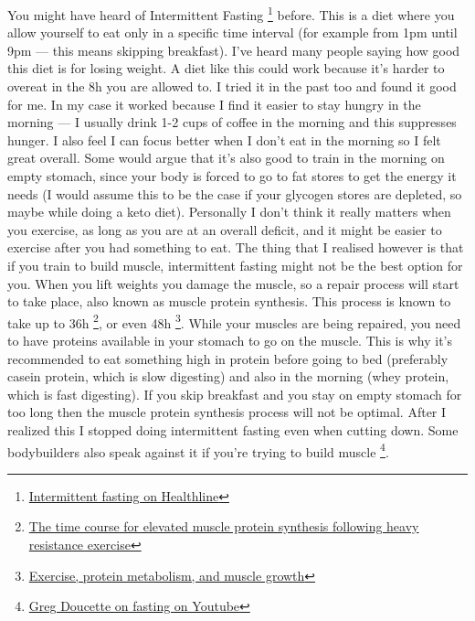 \documentclass[openany, 12pt]{book}
\begin{document}
        You might have heard of Intermittent Fasting
        \footnote{\href{https://www.healthline.com/nutrition/intermittent-fasting-guide}{Intermittent fasting on Healthline}}
        before. This is a diet where you allow yourself to eat only in a specific time interval (for example from 1pm until 9pm --- this means skipping breakfast).
        I've heard many people saying how good this diet is for losing weight. A diet like this could work because it's harder to overeat in the 8h you are allowed to.
        I tried it in the past too and found it good for me. In my case it worked because I find it easier to stay hungry in the morning --- I usually drink 1-2 cups of coffee
        in the morning and this suppresses hunger. I also feel I can focus better when I don't eat in the morning so I felt great overall. Some would argue that it's also good
        to train in the morning on empty stomach, since your body is forced to go to fat stores to get the energy it needs (I would assume this to be the case if your glycogen
        stores are depleted, so maybe while doing a keto diet). Personally I don't think it really matters when you exercise, as long as you are at an overall deficit, and it
        might be easier to exercise after you had something to eat. The thing that I realised however is that if you train to build muscle, intermittent fasting might
        not be the best option for you. When you lift weights you damage the muscle, so a repair process will start to take place, also known as muscle protein synthesis.
        This process is known to take up to 36h
        \footnote{\href{https://pubmed.ncbi.nlm.nih.gov/8563679/}{The time course for elevated muscle protein synthesis following heavy resistance exercise}}, or even 48h
        \footnote{\href{https://pubmed.ncbi.nlm.nih.gov/11255140/}{Exercise, protein metabolism, and muscle growth}}. While your muscles are being repaired, you
        need to have proteins available in your stomach to go on the muscle. This is why it's recommended to eat something high in protein before going to bed (preferably casein
        protein, which is slow digesting) and also in the morning (whey protein, which is fast digesting). If you skip breakfast and you stay on empty stomach for too long
        then the muscle protein synthesis process will not be optimal. After I realized this I stopped doing intermittent fasting even when cutting down. Some bodybuilders
        also speak against it if you're trying to build muscle
        \footnote{\href{https://www.youtube.com/watch?v=cMZ8Ijq-6Do}{Greg Doucette on fasting on Youtube}}.
\end{document}
